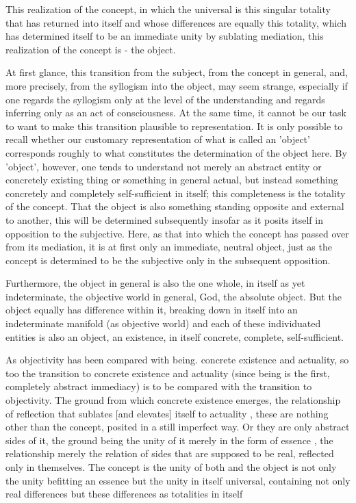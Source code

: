 This realization of the concept, in which
the universal is this singular totality that has returned into itself
and whose differences are equally this totality,
which has determined itself to be an immediate unity by sublating mediation,
this realization of the concept is - the object.

At first glance, this transition from the subject,
from the concept in general, and, more precisely,
from the syllogism into the object,
may seem strange, especially if one
regards the syllogism only at the level of the understanding and
regards inferring only as an act of consciousness.
At the same time, it cannot be our task to want
to make this transition plausible to representation.
It is only possible to recall whether our customary representation
of what is called an 'object' corresponds roughly to
what constitutes the determination of the object here.
By 'object', however, one tends to understand not merely
an abstract entity or concretely existing thing or
something in general actual, but instead something
concretely and completely self-sufficient in itself;
this completeness is the totality of the concept.
That the object is also something standing
opposite and external to another,
this will be determined subsequently insofar as
it posits itself in opposition to the subjective.
Here, as that into which the concept has passed over from its mediation,
it is at first only an immediate, neutral object,
just as the concept is determined to be the subjective
only in the subsequent opposition.

Furthermore, the object in general is also the one whole,
in itself as yet indeterminate, the objective world in general,
God, the absolute object.
But the object equally has difference within it, breaking
down in itself into an indeterminate manifold (as objective world)
and each of these individuated entities is also an object, an existence,
in itself concrete, complete, self-sufficient.

As objectivity has been compared with being. concrete existence
and actuality, so too the transition to concrete existence
and actuality (since being is the first, completely abstract
immediacy) is to be compared with the transition to objectivity.
The ground from which concrete existence emerges, the relationship
of reflection that sublates [and elevates] itself to actuality ,
these are nothing other than the concept,
posited in a still imperfect way. Or they are only abstract sides of it,
the ground being the unity of it merely in the form of essence ,
the relationship merely the relation of sides that are
supposed to be real, reflected only in themselves. The concept is the
unity of both and the object is not only the unity befitting an
essence but the unity in itself universal, containing not only real
differences but these differences as totalities in itself

